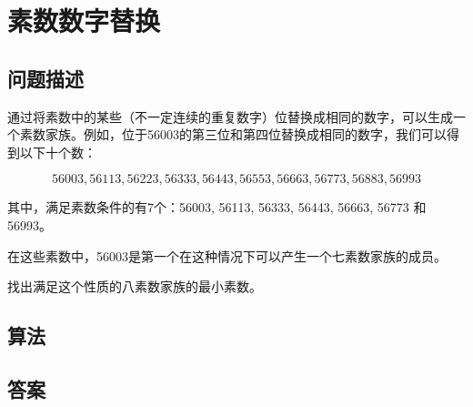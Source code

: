 \section{素数数字替换}
\subsection{问题描述}
\begin{tcolorbox}
通过将素数中的某些（不一定连续的重复数字）位替换成相同的数字，可以生成一个素数家族。例如，位于56003的第三位和第四位替换成相同的数字，我们可以得到以下十个数：

\[
56003, 56113, 56223, 56333, 56443, 56553, 56663, 56773, 56883, 56993
\]

其中，满足素数条件的有7个：56003, 56113, 56333, 56443, 56663, 56773 和 56993。

在这些素数中，56003是第一个在这种情况下可以产生一个七素数家族的成员。

找出满足这个性质的八素数家族的最小素数。
\end{tcolorbox}

\subsection{算法}


\subsection{答案}
